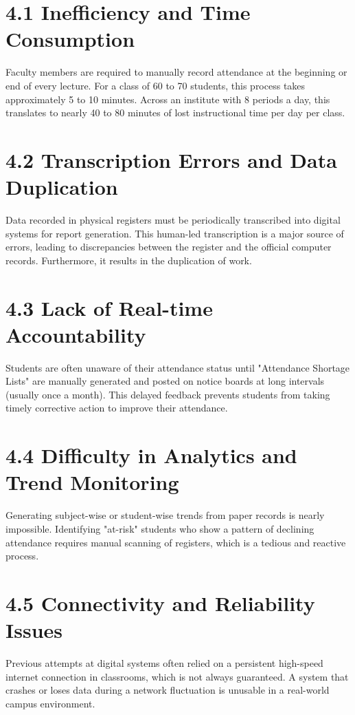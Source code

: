 \documentclass[12pt,a4paper]{report}
\begin{document}
\section*{4.1 Inefficiency and Time Consumption}
Faculty members are required to manually record attendance at the beginning or end of every lecture. For a class of 60 to 70 students, this process takes approximately 5 to 10 minutes. Across an institute with 8 periods a day, this translates to nearly 40 to 80 minutes of lost instructional time per day per class.

\section*{4.2 Transcription Errors and Data Duplication}
Data recorded in physical registers must be periodically transcribed into digital systems for report generation. This human-led transcription is a major source of errors, leading to discrepancies between the register and the official computer records. Furthermore, it results in the duplication of work.

\section*{4.3 Lack of Real-time Accountability}
Students are often unaware of their attendance status until "Attendance Shortage Lists" are manually generated and posted on notice boards at long intervals (usually once a month). This delayed feedback prevents students from taking timely corrective action to improve their attendance.

\section*{4.4 Difficulty in Analytics and Trend Monitoring}
Generating subject-wise or student-wise trends from paper records is nearly impossible. Identifying "at-risk" students who show a pattern of declining attendance requires manual scanning of registers, which is a tedious and reactive process.

\section*{4.5 Connectivity and Reliability Issues}
Previous attempts at digital systems often relied on a persistent high-speed internet connection in classrooms, which is not always guaranteed. A system that crashes or loses data during a network fluctuation is unusable in a real-world campus environment.
\end{document}
